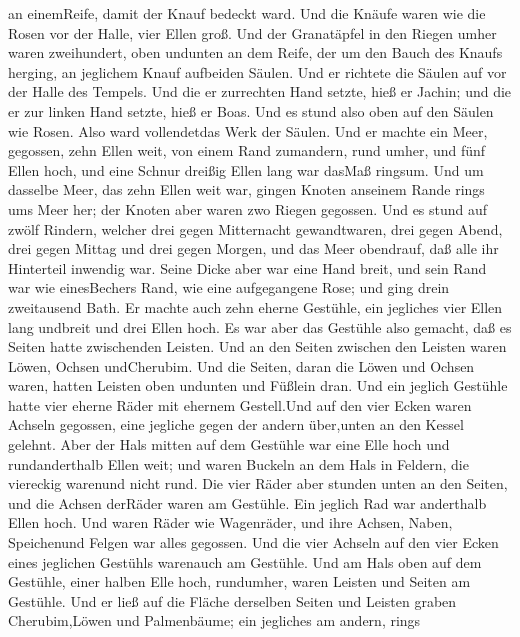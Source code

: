 an einemReife, damit der Knauf bedeckt ward.  Und die
Knäufe waren wie die Rosen vor der Halle, vier Ellen groß. 
Und der Granatäpfel in den Riegen umher waren zweihundert, oben undunten
an dem Reife, der um den Bauch des Knaufs herging, an jeglichem Knauf
aufbeiden Säulen.  Und er richtete die Säulen auf vor der
Halle des Tempels. Und die er zurrechten Hand setzte, hieß er Jachin;
und die er zur linken Hand setzte, hieß er Boas.  Und es
stund also oben auf den Säulen wie Rosen. Also ward vollendetdas Werk
der Säulen.  Und er machte ein Meer, gegossen, zehn Ellen
weit, von einem Rand zumandern, rund umher, und fünf Ellen hoch, und
eine Schnur dreißig Ellen lang war dasMaß ringsum.  Und um
dasselbe Meer, das zehn Ellen weit war, gingen Knoten anseinem Rande
rings ums Meer her; der Knoten aber waren zwo Riegen gegossen.
 Und es stund auf zwölf Rindern, welcher drei gegen
Mitternacht gewandtwaren, drei gegen Abend, drei gegen Mittag und drei
gegen Morgen, und das Meer obendrauf, daß alle ihr Hinterteil inwendig
war.  Seine Dicke aber war eine Hand breit, und sein Rand
war wie einesBechers Rand, wie eine aufgegangene Rose; und ging drein
zweitausend Bath.  Er machte auch zehn eherne Gestühle, ein
jegliches vier Ellen lang undbreit und drei Ellen hoch.  Es
war aber das Gestühle also gemacht, daß es Seiten hatte zwischenden
Leisten.  Und an den Seiten zwischen den Leisten waren
Löwen, Ochsen undCherubim. Und die Seiten, daran die Löwen und Ochsen
waren, hatten Leisten oben undunten und Füßlein dran.  Und
ein jeglich Gestühle hatte vier eherne Räder mit ehernem Gestell.Und auf
den vier Ecken waren Achseln gegossen, eine jegliche gegen der andern
über,unten an den Kessel gelehnt.  Aber der Hals mitten auf
dem Gestühle war eine Elle hoch und rundanderthalb Ellen weit; und waren
Buckeln an dem Hals in Feldern, die viereckig warenund nicht rund.
 Die vier Räder aber stunden unten an den Seiten, und die
Achsen derRäder waren am Gestühle. Ein jeglich Rad war anderthalb Ellen
hoch.  Und waren Räder wie Wagenräder, und ihre Achsen,
Naben, Speichenund Felgen war alles gegossen.  Und die vier
Achseln auf den vier Ecken eines jeglichen Gestühls warenauch am
Gestühle.  Und am Hals oben auf dem Gestühle, einer halben
Elle hoch, rundumher, waren Leisten und Seiten am Gestühle.
 Und er ließ auf die Fläche derselben Seiten und Leisten
graben Cherubim,Löwen und Palmenbäume; ein jegliches am andern, rings
